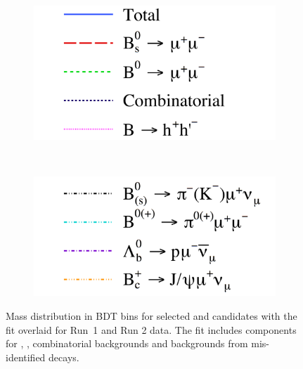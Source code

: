 {\begin{figure}[tbp]
    \begin{subfigure}[b]{0.3\textwidth}
       \includegraphics[width=\textwidth]{./Figs/BFAnalysis/legendA.pdf}
    \end{subfigure}
    ~
    \begin{subfigure}[b]{0.3\textwidth}
       \includegraphics[width=\textwidth]{./Figs/BFAnalysis/legendB.pdf}
    \end{subfigure}
    \caption{Mass distribution in BDT bins for selected \bsmumu and \bdmumu candidates with the fit overlaid for Run\
 1 and Run 2 data. The fit includes components for \bdmumu, \bsmumu, combinatorial backgrounds and backgrounds from mis-identified decays. }
    \label{fig:BFfit}
\end{figure}



}
